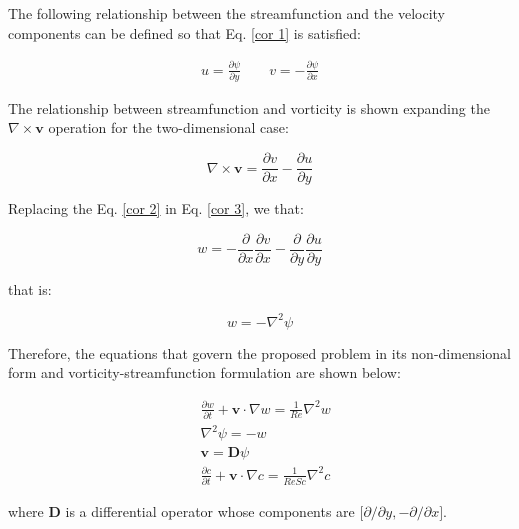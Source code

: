 \medskip
The following relationship between the streamfunction and
 the velocity components can be defined so that
 Eq. \ref{cor 1} is satisfied:


\begin{equation} \label{cor 2}
\begin{aligned}
 u = \frac{\partial \psi}{\partial y}
 \qquad
 v = - \frac{\partial \psi}{\partial x}
\end{aligned}
\end{equation}

\medskip
The relationship between streamfunction
and vorticity is shown expanding the
$\nabla \times \textbf{v}$ operation
for the two-dimensional case:


\begin{equation} \label{cor 3}
 \nabla \times \textbf{v}
 = 
 \frac{\partial v}{\partial x}
 - 
 \frac{\partial u}{\partial y}
\end{equation}

\medskip
\noindent
Replacing the 
Eq. \ref{cor 2} in Eq. \ref{cor 3},
we that:

\begin{equation}
 w
 =
 - 
 \frac{\partial}{\partial x} \frac{\partial v}{\partial x}
 -
 \frac{\partial}{\partial y} \frac{\partial u}{\partial y}
\end{equation}

\medskip
\noindent
that is:

\begin{equation}
 w
 = 
 -
 \nabla^{2} \psi
\end{equation}

\medskip
Therefore, the equations that govern the proposed problem
in its non-dimensional form and vorticity-streamfunction formulation
are shown below:

\begin{align}
& \frac{\partial w}{\partial t}
 +
 \textbf{v} \cdot \nabla w
 =
 \frac{1}{Re} \nabla^{2} w \label{vorticidade}
 \\[10pt] 
& \nabla^{2} \psi
 = 
 - 
 w \label{corrente} \\[10pt]
& \textbf{v} = \textbf{D} \psi \label{continuidade} \\[10pt]
& \frac{\partial c}{\partial t}
 +
 \textbf{v} \cdot \nabla c
 =
 \frac{1}{ReSc} \nabla^{2} c \label{especie quimica}
\end{align}

\medskip
\noindent
where \textbf{D} is a differential operator
whose components are $\big[
\partial / \partial y,
- \partial / \partial x \big]$. 


